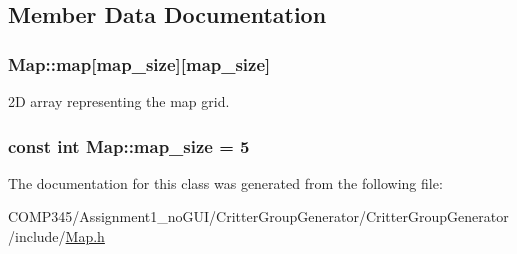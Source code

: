 \subsection{Member Data Documentation}
\hypertarget{class_map_aa5d63b554ad19c18cdc9911536e42001}{
\subsubsection[{map}]{ Map\+::map\mbox{[}{\bf map\+\_\+size}\mbox{]}\mbox{[}{\bf map\+\_\+size}\mbox{]}}}\label{class_map_aa5d63b554ad19c18cdc9911536e42001}


2\+D array representing the map grid. 

\hypertarget{class_map_a6f922edb15340e98aee860d269e50703}{
\subsubsection[{map\+\_\+size}]{\setlength{\rightskip}{0pt plus 5cm}const int Map\+::map\+\_\+size = 5\hspace{0.3cm}{\ttfamily [static]}}}\label{class_map_a6f922edb15340e98aee860d269e50703}


The documentation for this class was generated from the following file\+:\begin{DoxyCompactItemize}
\item 
C\+O\+M\+P345/\+Assignment1\+\_\+no\+G\+U\+I/\+Critter\+Group\+Generator/\+Critter\+Group\+Generator/include/\hyperlink{_map_8h}{Map.\+h}\end{DoxyCompactItemize}
